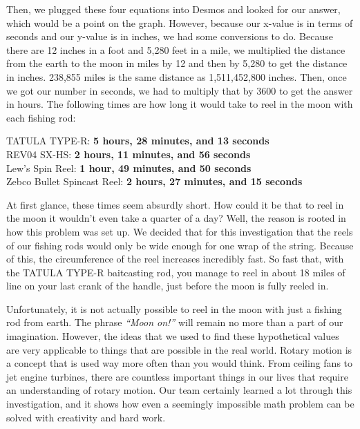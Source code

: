 Then, we plugged these four equations into Desmos and looked for our answer, which would be a point on the graph. However, because our x-value is in terms of seconds and our y-value is in inches, we had some conversions to do. Because there are 12 inches in a foot and 5,280 feet in a mile, we multiplied the distance from the earth to the moon in miles by 12 and then by 5,280 to get the distance in inches. 238,855 miles is the same distance as 1,511,452,800 inches. Then, once we got our number in seconds, we had to multiply that by 3600 to get the answer in hours. The following times are how long it would take to reel in the moon with each fishing rod:

\begin{center}
    TATULA TYPE-R:  \textbf{5 hours, 28 minutes, and 13 seconds}\\
    REV04 SX-HS:  \textbf{2 hours, 11 minutes, and 56 seconds}\\
    Lew's Spin Reel:  \textbf{1 hour, 49 minutes, and 50 seconds}\\
    Zebco Bullet Spincast Reel:  \textbf{2 hours, 27 minutes, and 15 seconds}
\end{center}

At first glance, these times seem absurdly short. How could it be that to reel in the moon it wouldn’t even take a quarter of a day? Well, the reason is rooted in how this problem was set up. We decided that for this investigation that the reels of our fishing rods would only be wide enough for one wrap of the string. Because of this, the circumference of the reel increases incredibly fast. So fast that, with the TATULA TYPE-R baitcasting rod, you manage to reel in about 18 miles of line on your last crank of the handle, just before the moon is fully reeled in.

Unfortunately, it is not actually possible to reel in the moon with just a fishing rod from earth. The phrase \emph{“Moon on!”} will remain no more than a part of our imagination. However, the ideas that we used to find these hypothetical values are very applicable to things that are possible in the real world. Rotary motion is a concept that is used way more often than you would think. From ceiling fans to jet engine turbines, there are countless important things in our lives that require an understanding of rotary motion. Our team certainly learned a lot through this investigation, and it shows how even a seemingly impossible math problem can be solved with creativity and hard work.

